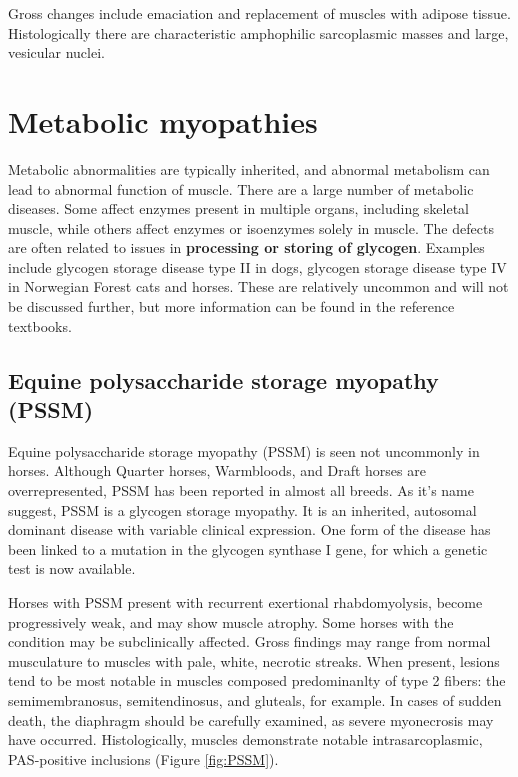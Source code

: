 \documentclass[openany]{book}
\begin{document}
Gross changes include emaciation and replacement of muscles with adipose
tissue. Histologically there are characteristic amphophilic sarcoplasmic
masses and large, vesicular nuclei.

\section{Metabolic myopathies}\label{metabolic-myopathies}

Metabolic abnormalities are typically inherited, and abnormal metabolism
can lead to abnormal function of muscle. There are a large number of
metabolic diseases. Some affect enzymes present in multiple organs,
including skeletal muscle, while others affect enzymes or isoenzymes
solely in muscle. The defects are often related to issues in
\textbf{processing or storing of glycogen}. Examples include glycogen
storage disease type II in dogs, glycogen storage disease type IV in
Norwegian Forest cats and horses. These are relatively uncommon and will
not be discussed further, but more information can be found in the
reference textbooks.

\hypertarget{equine-polysaccharide-storage-myopathy-pssm}{\subsection{Equine
polysaccharide storage myopathy
(PSSM)}\label{equine-polysaccharide-storage-myopathy-pssm}}

Equine polysaccharide storage myopathy (PSSM) is seen not uncommonly in
horses. Although Quarter horses, Warmbloods, and Draft horses are
overrepresented, PSSM has been reported in almost all breeds. As it's
name suggest, PSSM is a glycogen storage myopathy. It is an inherited,
autosomal dominant disease with variable clinical expression. One form
of the disease has been linked to a mutation in the glycogen synthase I
gene, for which a genetic test is now available.

Horses with PSSM present with recurrent exertional rhabdomyolysis,
become progressively weak, and may show muscle atrophy. Some horses with
the condition may be subclinically affected. Gross findings may range
from normal musculature to muscles with pale, white, necrotic streaks.
When present, lesions tend to be most notable in muscles composed
predominanlty of type 2 fibers: the semimembranosus, semitendinosus, and
gluteals, for example. In cases of sudden death, the diaphragm should be
carefully examined, as severe myonecrosis may have occurred.
Histologically, muscles demonstrate notable intrasarcoplasmic,
PAS-positive inclusions (Figure \ref{fig:PSSM}).
\end{document}
